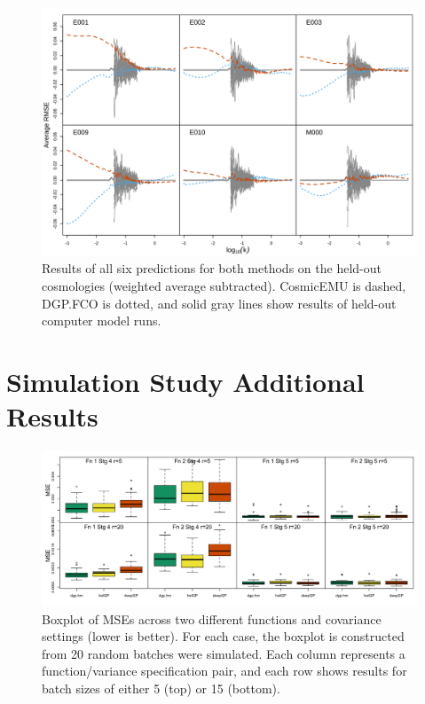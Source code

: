 \documentclass[11pt]{article}
\begin{document}
\begin{figure}[ht]
    \centering
    \includegraphics[width=6in]{pred_1to6.png}
    \caption{Results of all six predictions for both methods on the held-out 
    cosmologies (weighted average subtracted). CosmicEMU is dashed, DGP.FCO is dotted, 
    and solid gray lines show results of held-out computer model runs.}
    \label{fig:plot_pred_1to6}
\end{figure}

\section{Simulation Study Additional Results}
\label{sec:apdx_sims}

\begin{figure}
    \centering
    \includegraphics[width=6in]{sims_MSE.png}
    \caption{Boxplot of MSEs across two different functions and covariance settings 
             (lower is better). For each case, the boxplot is constructed from 20 
             random batches were simulated. Each column represents a function/variance 
             specification pair, and each row shows results for batch sizes of 
             either 5 (top) or 15 (bottom).}    
    \label{fig:sims_MSE}
\end{figure}



\end{document}
